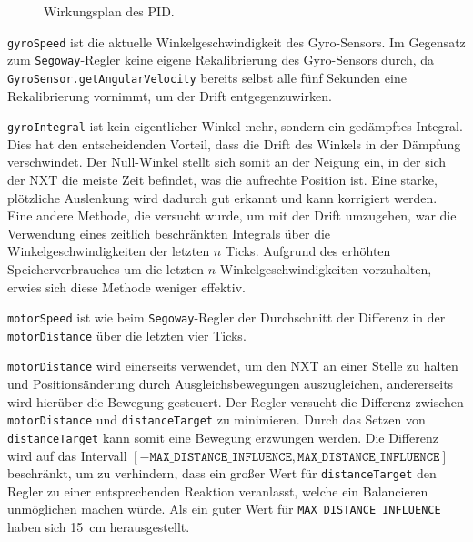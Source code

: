 \documentclass[oneside,abstractoff,a4paper]{scrartcl}
\begin{document}
\begin{sloppypar}
\begin{figure}
  \caption{Wirkungsplan des PID.}
  \label{fig:pid}
\end{figure}
\texttt{gyroSpeed} ist die aktuelle Winkelgeschwindigkeit des Gyro-Sensors. Im Gegensatz zum \texttt{Segoway}-Regler keine eigene Rekalibrierung des Gyro-Sensors durch, da \texttt{GyroSensor.getAngularVelocity} bereits selbst alle fünf Sekunden eine Rekalibrierung vornimmt, um der Drift entgegenzuwirken.

\texttt{gyroIntegral} ist kein eigentlicher Winkel mehr, sondern ein gedämpftes Integral. Dies hat den entscheidenden Vorteil, dass die Drift des Winkels in der Dämpfung verschwindet. Der Null-Winkel stellt sich somit an der Neigung ein, in der sich der NXT die meiste Zeit befindet, was die aufrechte Position ist. Eine starke, plötzliche Auslenkung wird dadurch gut erkannt und kann korrigiert werden. Eine andere Methode, die versucht wurde, um mit der Drift umzugehen, war die Verwendung eines zeitlich beschränkten Integrals über die Winkelgeschwindigkeiten der letzten $n$ Ticks. Aufgrund des erhöhten Speicherverbrauches um die letzten $n$ Winkelgeschwindigkeiten vorzuhalten, erwies sich diese Methode weniger effektiv. 

\texttt{motorSpeed} ist wie beim \texttt{Segoway}-Regler der Durchschnitt der Differenz in der \texttt{motorDistance} über die letzten vier Ticks.

\texttt{motorDistance} wird einerseits verwendet, um den NXT an einer Stelle zu halten und Positionsänderung durch Ausgleichsbewegungen auszugleichen, andererseits wird hierüber die Bewegung gesteuert. Der Regler versucht die Differenz zwischen \texttt{motorDistance} und \texttt{distanceTarget} zu minimieren. Durch das Setzen von \texttt{distanceTarget} kann somit eine Bewegung erzwungen werden. Die Differenz wird auf das Intervall $[-\texttt{MAX\_DISTANCE\_INFLUENCE}, \texttt{MAX\_DISTANCE\_INFLUENCE}]$ beschränkt, um zu verhindern, dass ein großer Wert für \texttt{distanceTarget} den Regler zu einer entsprechenden Reaktion veranlasst, welche ein Balancieren unmöglichen  machen würde. Als ein guter Wert für \texttt{MAX\_DISTANCE\_INFLUENCE} haben sich \SI{15}{\centi\meter} herausgestellt.


\end{sloppypar}
\end{document}
